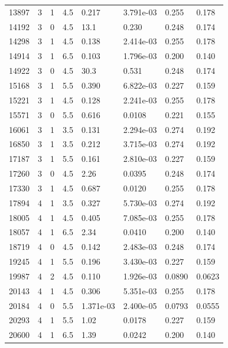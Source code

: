 \documentclass[preview]{standalone}
\begin{document}
{{{\begin{tabular}{L{1.2cm}C{1.2cm} C{0.3cm}C{0.5cm} C{1.4cm}C{1.4cm} C{1.4cm}C{1.4cm}}
  13897  &     3  & 1     & 4.5 &  0.217  & 3.791e-03  & 0.255 &  0.178   \\ 
  14192  &     3  & 0     & 4.5 &  13.1  & 0.230  & 0.248 &  0.174   \\ 
  14298  &     3  & 1     & 4.5 &  0.138  & 2.414e-03  & 0.255 &  0.178   \\ 
  14914  &     3  & 1     & 6.5 &  0.103  & 1.796e-03  & 0.200 &  0.140   \\ 
  14922  &     3  & 0     & 4.5 &  30.3  & 0.531  & 0.248 &  0.174   \\ 
  15168  &     3  & 1     & 5.5 &  0.390  & 6.822e-03  & 0.227 &  0.159   \\ 
  15221  &     3  & 1     & 4.5 &  0.128  & 2.241e-03  & 0.255 &  0.178   \\ 
  15571  &     3  & 0     & 5.5 &  0.616  & 0.0108  & 0.221 &  0.155   \\ 
  16061  &     3  & 1     & 3.5 &  0.131  & 2.294e-03  & 0.274 &  0.192   \\ 
  16850  &     3  & 1     & 3.5 &  0.212  & 3.715e-03  & 0.274 &  0.192   \\ 
  17187  &     3  & 1     & 5.5 &  0.161  & 2.810e-03  & 0.227 &  0.159   \\ 
  17260  &     3  & 0     & 4.5 &  2.26  & 0.0395  & 0.248 &  0.174   \\ 
  17330  &     3  & 1     & 4.5 &  0.687  & 0.0120  & 0.255 &  0.178   \\ 
  17894  &     4  & 1     & 3.5 &  0.327  & 5.730e-03  & 0.274 &  0.192   \\ 
  18005  &     4  & 1     & 4.5 &  0.405  & 7.085e-03  & 0.255 &  0.178   \\ 
  18057  &     4  & 1     & 6.5 &  2.34  & 0.0410  & 0.200 &  0.140   \\ 
  18719  &     4  & 0     & 4.5 &  0.142  & 2.483e-03  & 0.248 &  0.174   \\ 
  19245  &     4  & 1     & 5.5 &  0.196  & 3.430e-03  & 0.227 &  0.159   \\ 
  19987  &     4  & 2     & 4.5 &  0.110  & 1.926e-03  & 0.0890 &  0.0623   \\ 
  20143  &     4  & 1     & 4.5 &  0.306  & 5.351e-03  & 0.255 &  0.178   \\ 
  20184  &     4  & 0     & 5.5 &  1.371e-03  & 2.400e-05  & 0.0793 &  0.0555   \\ 
  20293  &     4  & 1     & 5.5 &  1.02  & 0.0178  & 0.227 &  0.159   \\ 
  20600  &     4  & 1     & 6.5 &  1.39  & 0.0242  & 0.200 &  0.140   \\ 

\end{tabular}}}}
\end{document}
